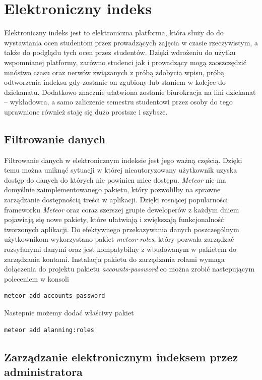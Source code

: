 \documentclass[brudnopis]{xmgr}
\begin{document}
\chapter{Elektroniczny indeks}
Elektroniczny indeks jest to elektroniczna platforma, która służy do do wystawiania ocen studentom przez prowadzących zajęcia w czasie rzeczywistym, a także do podglądu tych ocen przez studentów. Dzięki wdrożeniu do użytku wspomnianej platformy, zarówno studenci jak i prowadzący mogą zaoszczędzić mnóstwo czasu oraz nerwów związanych z próbą zdobycia wpisu, próbą odtworzenia indeksu gdy zostanie on zgubiony lub staniem w kolejce do dziekanatu. Dodatkowo znacznie ułatwiona zostanie biurokracja na lini dziekanat -- wykładowca, a samo zaliczenie semestru studentowi przez osoby do tego uprawnione również staję się dużo prostsze i szybsze.

\section{Filtrowanie danych}

Filtrowanie danych w elektronicznym indeksie jest jego ważną częścią. Dzięki temu można uniknąć sytuacji w której nieautoryzowany użytkownik uzyska dostęp do danych do których nie powinien miec dostępu. \textit{Meteor} nie ma domyślnie zaimplementowanego pakietu, który pozwoliłby na sprawne zarządzanie dostępnością treści w aplikacji.  Dzięki rosnącej popularności frameworku \textit{Meteor} oraz coraz szerszej grupie deweloperów z każdym dniem pojawiają się nowe pakiety, które ułatwiają i zwiększają funkcjonalność tworzonych aplikacji. Do efektywnego przekazywania danych poszczególnym użytkownikom wykorzystano pakiet \textit{meteor-roles}, który pozwala zarządzać rozsyłanymi danymi oraz jest kompatybilny z wbudowanym w pakietem do zarządzania kontami. Instalacja pakietu do zarządzania rolami wymaga dołączenia do projektu pakietu \textit{accounts-password} co można zrobić nastepującym poleceniem w konsoli
\newpage
\begin{lstlisting}[language=bash,caption={Instalacja accounts-password}]
	meteor add accounts-password
\end{lstlisting}

Nastepnie możemy dodać właściwy pakiet

\begin{lstlisting}[language=bash,caption={Instalacja pakietu roles}]
	meteor add alanning:roles
\end{lstlisting}


\section{Zarządzanie elektronicznym indeksem przez administratora}
\end{document}

